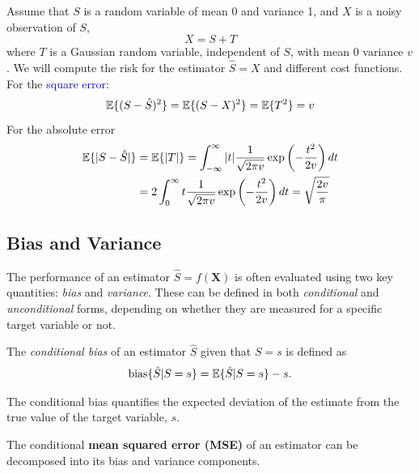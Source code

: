 \begin{example}
Assume that $S$ is a random variable of mean 0 and variance 1, and $X$ is a noisy observation of $S$,
\begin{equation}
X = S + T
\end{equation}
where $T$ is a Gaussian random variable, independent of $S$, with mean $0$ variance $v$. We will compute the risk for the estimator $\hat{S} = X$ and different cost functions. For the \textcolor{blue}{square error}:
\begin{equation}
\mathbb{E}\{(S-\hat{S})^2\} = \mathbb{E}\{(S-X)^2\} = \mathbb{E}\{T^2\} = v
\end{equation}
For the absolute error
\begin{align}
\mathbb{E}\{|S-\hat{S}|\}
    &= \mathbb{E}\{|T|\} 
     = \int_{-\infty}^{\infty} |t| \frac{1}{\sqrt{2\pi v}}\exp\left(-\frac{t^2}{2v}\right)dt 
\nonumber\\
    &= 2 \int_{0}^{\infty} t \frac{1}{\sqrt{2\pi v}}\exp\left(-\frac{t^2}{2v}\right)dt 
     = \sqrt{\frac{2v}{\pi}}
\end{align}
\end{example}


\subsection{Bias and Variance}
\label{subsec.bias_variance}

The performance of an estimator $\hat{S} = f(\mathbf{X})$ is often evaluated using two key quantities: \textit{bias} and \textit{variance}. These can be defined in both \textit{conditional} and \textit{unconditional} forms, depending on whether they are measured for a specific target variable or not.

\begin{definition}
The \textit{conditional bias} of an estimator $\hat{S}$ given that $S = s$ is defined as
\begin{align}
\text{bias}\{\hat{S} | S=s\} = \mathbb{E}\{\hat{S} | S=s\} - s.
\end{align}
\end{definition}

The conditional bias quantifies the expected deviation of the estimate from the true value of the target variable, $s$. 

The conditional \textbf{mean squared error (MSE)} of an estimator can be decomposed into its bias and variance components.

